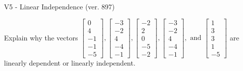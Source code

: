 \begin{exercise}
  \begin{exerciseTitle}V5 - Linear Independence (ver. 897)\end{exerciseTitle}
  \begin{exerciseStatement}
    Explain why the vectors \(\left[\begin{array}{r}
0 \\
4 \\
-1 \\
-1 \\
-5
\end{array}\right] , \left[\begin{array}{r}
-3 \\
-2 \\
4 \\
-4 \\
-1
\end{array}\right] , \left[\begin{array}{r}
-2 \\
2 \\
0 \\
-5 \\
-2
\end{array}\right] , \left[\begin{array}{r}
-3 \\
-2 \\
4 \\
-4 \\
-1
\end{array}\right] , \text{ and } \left[\begin{array}{r}
1 \\
3 \\
3 \\
1 \\
-5
\end{array}\right]\) are linearly dependent or linearly independent.	



\end{exerciseStatement}
\end{exercise}
